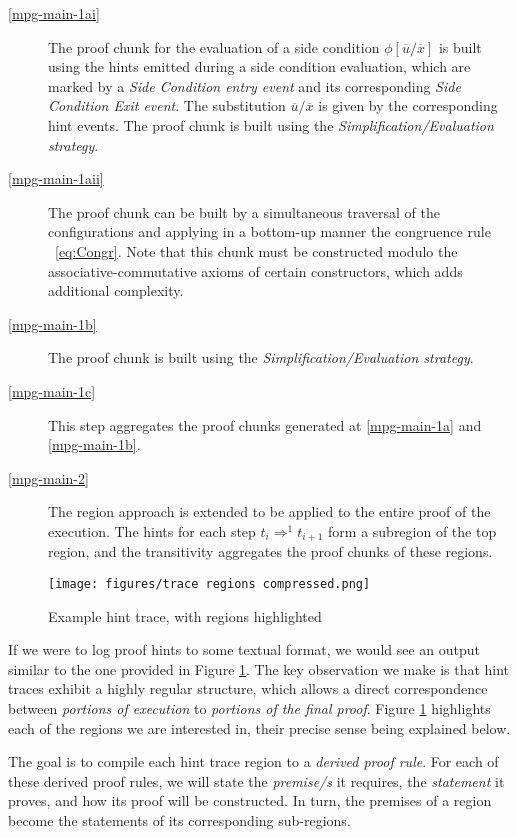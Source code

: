 \documentclass{article}
\theoremstyle{plain}
\theoremstyle{definition}
\begin{document}
\begin{description}
\item[\cref{mpg-main-1ai}] 
The proof chunk for the evaluation of a side condition $\phi[\overline{u}/\overline{x}]$ is built using the hints emitted during a side condition evaluation, which are marked by a \textit{Side Condition entry event} and its corresponding \textit{Side Condition Exit event}. 
The substitution $\overline{u}/\overline{x}$ is given by the corresponding hint events. The proof chunk is built using the \textit{Simplification/Evaluation strategy}. 
\item[\cref{mpg-main-1aii}] 
The proof chunk can be built by a simultaneous traversal of the configurations and applying in a bottom-up manner the congruence rule ~\eqref{eq:Congr}. Note that this chunk must be constructed modulo the associative-commutative axioms of certain constructors, which adds additional complexity.
\item[\cref{mpg-main-1b}]
The proof chunk is built using the \textit{Simplification/Evaluation strategy}. 
\item[\cref{mpg-main-1c}]
This step aggregates the proof chunks generated at \cref{mpg-main-1a} and \cref{mpg-main-1b}.
\item[\cref{mpg-main-2}] 
The region approach is extended to be applied to the entire proof of the execution. The hints for each step $t_i\Rightarrow^1 t_{i+1}$ form a subregion of the top region, and the transitivity aggregates the proof chunks of these regions.
\end{description}


\iffalse
{}

\begin{figure}
    \centering
    \texttt{[image: figures/trace regions compressed.png]}
    \caption{Example hint trace, with regions highlighted}
    \label{fig:hint_trace}
\end{figure}

If we were to log proof hints to some textual format, we would see an output similar to the one provided in Figure \ref{fig:hint_trace}. The key observation we make is that hint traces exhibit a highly regular structure, which allows a direct correspondence between \textit{portions of execution} to \textit{portions of the final proof}. Figure \ref{fig:hint_trace} highlights each of the regions we are interested in, their precise sense being explained below.

The goal is to compile each hint trace region to a \textit{derived proof rule}. For each of these derived proof rules, we will state the \textit{premise/s} it requires, the \textit{statement} it proves, and how its proof will be constructed. In turn, the premises of a region become the statements of its corresponding sub-regions.
\end{document}
